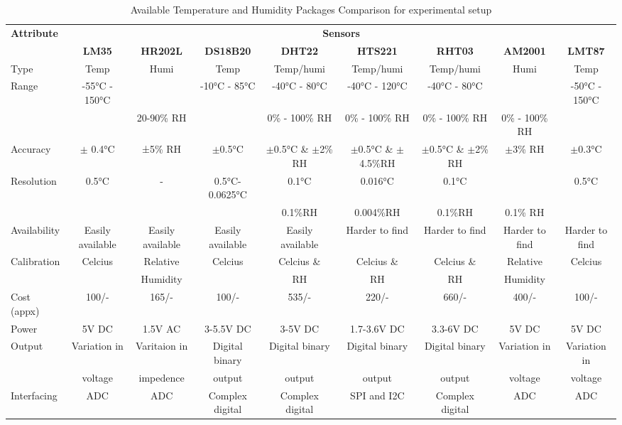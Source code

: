 \documentclass[a4paper,12pt]{report}
\begin{document}
\begin{landscape}
\begin{table}[h]
\centering
\scriptsize  
\caption{Available Temperature and Humidity Packages Comparison for experimental setup}
 \begin{tabular}{||l|c|c|c|c|c|c|c|c|}\hline
\multirow{2}{*}{\bf Attribute} & \multicolumn{8}{c|}{\bf Sensors} \\
\hhline{~--------}
		&\bf LM35	&\bf HR202L	&\bf DS18B20	&\bf DHT22	&\bf HTS221	&\bf RHT03	&\bf AM2001	&\bf LMT87\\ \hline
Type		& Temp		& Humi		&Temp		&Temp/humi	&Temp/humi	&Temp/humi	&Humi		&Temp		\\ \hline
Range	 	&-55°C - 150°C &  		&-10°C - 85°C	&-40°C - 80°C  	&-40°C - 120°C  &-40°C - 80°C   & 		&-50°C - 150°C	\\
		&		&20-90\% RH	&		&0\% - 100\% RH	&0\% - 100\% RH	&0\% - 100\% RH&0\% - 100\% RH&		\\ \hline
Accuracy	&$\pm$ 0.4°C	&±5\% RH 	& $\pm$0.5°C 	& $\pm$0.5°C \& $\pm$2\% RH &$\pm$0.5°C \& $\pm$4.5\%RH &$\pm$0.5°C \& $\pm$2\% RH &$\pm$3\% RH &$\pm$0.3°C\\ \hline
Resolution	&0.5°C		&-		&0.5°C-0.0625°C &0.1°C   	&0.016°C  	&0.1°C  	& 		&0.5°C\\ 
		&		&		&		&0.1\%RH	&0.004\%RH	& 0.1\%RH	&0.1\% RH 	&	\\\hline	
Availability	&Easily available &Easily available &Easily available &Easily available &Harder to find &Harder to find &Harder to find & Harder to find \\ \hline
Calibration	&Celcius 	&Relative   	&Celcius	&Celcius \& 	&Celcius \&	&Celcius \&	&Relative	& Celcius	\\
		&		&Humidity	&		&RH		&  RH		& RH		&Humidity	&	\\ \hline
Cost (appx)	&100/-		&165/-		&100/-		&535/-		&220/-		&660/-		&400/-		&100/-\\ \hline
Power 		&5V DC		&1.5V AC	&3-5.5V DC	&3-5V DC	&1.7-3.6V DC	&3.3-6V DC	&5V DC		&5V DC\\ \hline
Output 		&Variation in 	&Varitaion in 	&Digital binary &Digital binary &Digital binary &Digital binary &Variation in 	&Variation in \\ 
		&voltage	&impedence	&output		&output		&output		&output		&voltage	& voltage\\ \hline
Interfacing	&ADC 		&ADC 		&Complex digital&Complex digital&SPI and I2C 	&Complex digital &ADC 		&ADC \\ \hline

 \end{tabular}

\end{table}
\end{landscape}
\end{document}
